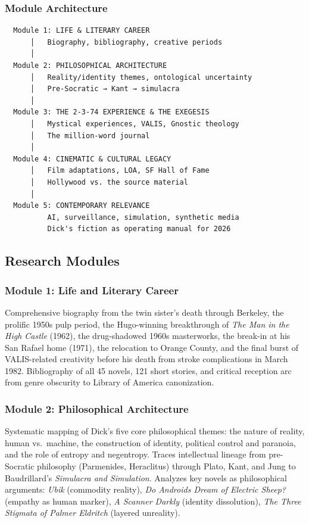 \documentclass[11pt,letterpaper]{article}
\begin{document}
\subsubsection{Module Architecture}

\begin{asciibox}
\begin{verbatim}
  Module 1: LIFE & LITERARY CAREER
      │   Biography, bibliography, creative periods
      │
  Module 2: PHILOSOPHICAL ARCHITECTURE
      │   Reality/identity themes, ontological uncertainty
      │   Pre-Socratic → Kant → simulacra
      │
  Module 3: THE 2-3-74 EXPERIENCE & THE EXEGESIS
      │   Mystical experiences, VALIS, Gnostic theology
      │   The million-word journal
      │
  Module 4: CINEMATIC & CULTURAL LEGACY
      │   Film adaptations, LOA, SF Hall of Fame
      │   Hollywood vs. the source material
      │
  Module 5: CONTEMPORARY RELEVANCE
          AI, surveillance, simulation, synthetic media
          Dick's fiction as operating manual for 2026
\end{verbatim}
\end{asciibox}

\subsection{Research Modules}

\subsubsection{Module 1: Life and Literary Career}

Comprehensive biography from the twin sister's death through Berkeley, the prolific 1950s pulp period, the Hugo-winning breakthrough of \textit{The Man in the High Castle} (1962), the drug-shadowed 1960s masterworks, the break-in at his San Rafael home (1971), the relocation to Orange County, and the final burst of VALIS-related creativity before his death from stroke complications in March 1982. Bibliography of all 45 novels, 121 short stories, and critical reception arc from genre obscurity to Library of America canonization.

\subsubsection{Module 2: Philosophical Architecture}

Systematic mapping of Dick's five core philosophical themes: the nature of reality, human vs.\ machine, the construction of identity, political control and paranoia, and the role of entropy and negentropy. Traces intellectual lineage from pre-Socratic philosophy (Parmenides, Heraclitus) through Plato, Kant, and Jung to Baudrillard's \textit{Simulacra and Simulation}. Analyzes key novels as philosophical arguments: \textit{Ubik} (commodity reality), \textit{Do Androids Dream of Electric Sheep?} (empathy as human marker), \textit{A Scanner Darkly} (identity dissolution), \textit{The Three Stigmata of Palmer Eldritch} (layered unreality).
\end{document}
